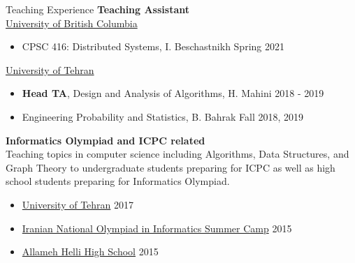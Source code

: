 \documentclass{resume} %
\begin{document}
\begin{rSection}{Teaching Experience}
	{\bf Teaching Assistant}
	\\\href{https://www.ubc.ca/}{University of British Columbia}
	\vspace{-0.5em}
	\begin{itemize}[leftmargin=3mm]
		\setlength{\itemsep}{1pt}
		\setlength{\parskip}{0pt}
		\setlength{\parsep}{0pt}
		\renewcommand\labelitemi{$\cdot$}

		\item CPSC 416: Distributed Systems, I. Beschastnikh \hfill Spring 2021
	\end{itemize}
	
	\href{http://ut.ac.ir/en}{University of Tehran}
	\vspace{-0.5em}
	\begin{itemize}[leftmargin=3mm]
		\setlength{\itemsep}{1pt}
		\setlength{\parskip}{0pt}
		\setlength{\parsep}{0pt}
		\renewcommand\labelitemi{$\cdot$}

		\item {\bf Head TA}, Design and Analysis of Algorithms, H. Mahini \hfill 2018 - 2019 
		\item Engineering Probability and Statistics, B. Bahrak \hfill Fall 2018, 2019
	\end{itemize}
	
	{\bf Informatics Olympiad and ICPC related}
	\\Teaching topics in computer science including Algorithms, Data Structures,
	and Graph Theory to undergraduate students preparing for ICPC as well as high school
	students preparing for Informatics Olympiad.

	\vspace{-0.5em}
	\begin{itemize}[leftmargin=3mm]
		\setlength{\itemsep}{1pt}
		\setlength{\parskip}{0pt}
		\setlength{\parsep}{0pt}
		\renewcommand\labelitemi{$\cdot$}

		\item \href{http://ut.ac.ir/en}{University of Tehran} \hfill 2017
		\item \href{http://inoi.ir/}{Iranian National Olympiad in Informatics Summer Camp} \hfill 2015
		\item \href{http://www.helli.ir/}{Allameh Helli High School} \hfill 2015
	\end{itemize}
\end{rSection}

\end{document}
